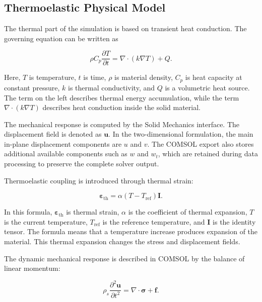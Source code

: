 \subsection{Thermoelastic Physical Model}

The thermal part of the simulation is based on transient heat conduction. The governing equation can be written as

\begin{equation}
\rho C_p \frac{\partial T}{\partial t}
=
\nabla \cdot \left( k \nabla T \right) + Q .
\end{equation}

Here, \(T\) is temperature, \(t\) is time, \(\rho\) is material density, \(C_p\) is heat capacity at constant pressure, \(k\) is thermal conductivity, and \(Q\) is a volumetric heat source. The term on the left describes thermal energy accumulation, while the term \(\nabla \cdot (k \nabla T)\) describes heat conduction inside the solid material.

The mechanical response is computed by the Solid Mechanics interface. The displacement field is denoted as \(\mathbf{u}\). In the two-dimensional formulation, the main in-plane displacement components are \(u\) and \(v\). The COMSOL export also stores additional available components such as \(w\) and \(w_t\), which are retained during data processing to preserve the complete solver output.

Thermoelastic coupling is introduced through thermal strain:

\begin{equation}
\boldsymbol{\varepsilon}_{\mathrm{th}}
=
\alpha
\left(
T - T_{\mathrm{ref}}
\right)
\mathbf{I}.
\end{equation}

In this formula, \(\boldsymbol{\varepsilon}_{\mathrm{th}}\) is thermal strain, \(\alpha\) is the coefficient of thermal expansion, \(T\) is the current temperature, \(T_{\mathrm{ref}}\) is the reference temperature, and \(\mathbf{I}\) is the identity tensor. The formula means that a temperature increase produces expansion of the material. This thermal expansion changes the stress and displacement fields.

The dynamic mechanical response is described in COMSOL by the balance of linear momentum:

\begin{equation}
\rho_s
\frac{\partial^2 \mathbf{u}}{\partial t^2}
=
\nabla \cdot \boldsymbol{\sigma}
+
\mathbf{f}.
\end{equation}

